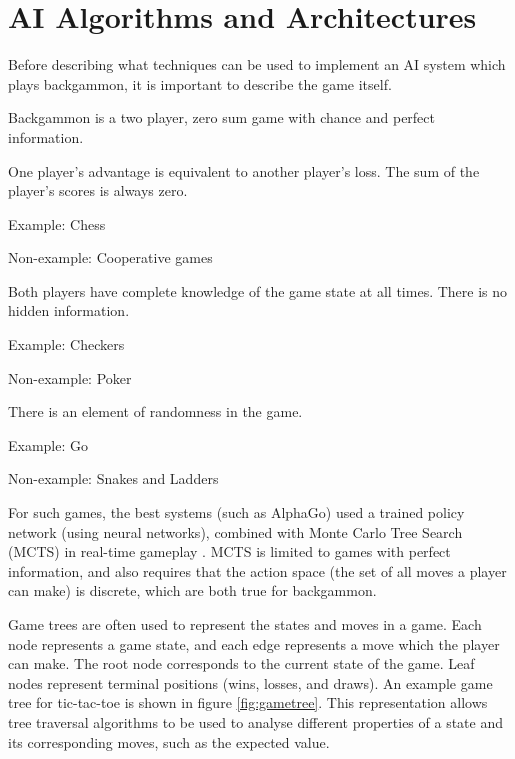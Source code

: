 \chapter{AI Algorithms and Architectures}
Before describing what techniques can be used to implement an AI system which plays backgammon, it is important to describe the game itself.

Backgammon is a two player, zero sum game with chance and perfect information.
\begin{definition}
One player's advantage is equivalent to another player's loss. The sum of the player's scores is always zero.

Example: Chess

Non-example: Cooperative games
\end{definition}

\begin{definition}
    Both players have complete knowledge of the game state at all times. There is no hidden information.

    Example: Checkers

    Non-example: Poker
\end{definition}

\begin{definition}[Chance]
    There is an element of randomness in the game.

    Example: Go

    Non-example: Snakes and Ladders
    
\end{definition}

For such games, the best systems (such as AlphaGo) used a trained policy network (using neural networks), combined with Monte Carlo Tree Search (MCTS) in real-time gameplay \cite{aiparadigms} \cite{alphago}.
MCTS is limited to games with perfect information, and also requires that the action space (the set of all moves a player can make) is discrete, which are both true for backgammon.

Game trees are often used to represent the states and moves in a game. Each node represents a game state, and each edge represents a move which the player can make. The root node corresponds to the current state of the game. Leaf nodes represent terminal positions (wins, losses, and draws). An example game tree for tic-tac-toe is shown in figure \ref{fig:gametree}. This representation allows tree traversal algorithms to be used to analyse different properties of a state and its corresponding moves, such as the expected value.

